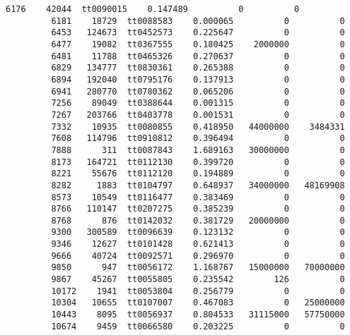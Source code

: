 \documentclass[11pt]{article}
\begin{document}
\begin{Verbatim}[commandchars=\\\{\}]
         6176    42044  tt0090015    0.147489          0          0   
         6181    18729  tt0088583    0.000065          0          0   
         6453   124673  tt0452573    0.225647          0          0   
         6477    19082  tt0367555    0.180425    2000000          0   
         6481    11788  tt0465326    0.270637          0          0   
         6829   134777  tt0830361    0.265388          0          0   
         6894   192040  tt0795176    0.137913          0          0   
         6941   280770  tt0780362    0.065206          0          0   
         7256    89049  tt0388644    0.001315          0          0   
         7267   203766  tt0403778    0.001531          0          0   
         7332    10935  tt0080855    0.418950   44000000    3484331   
         7608   114796  tt0910812    0.396494          0          0   
         7888      311  tt0087843    1.689163   30000000          0   
         8173   164721  tt0112130    0.399720          0          0   
         8221    55676  tt0112120    0.194889          0          0   
         8282     1883  tt0104797    0.648937   34000000   48169908   
         8573    10549  tt0116477    0.383469          0          0   
         8766   110147  tt0207275    0.385239          0          0   
         8768      876  tt0142032    0.381729   20000000          0   
         9300   300589  tt0096639    0.123132          0          0   
         9346    12627  tt0101428    0.621413          0          0   
         9666    40724  tt0092571    0.296970          0          0   
         9850      947  tt0056172    1.168767   15000000   70000000   
         9867    45267  tt0055805    0.235542        126          0   
         10172    1941  tt0053804    0.256779          0          0   
         10304   10655  tt0107007    0.467083          0   25000000   
         10443    8095  tt0056937    0.804533   31115000   57750000   
         10674    9459  tt0066580    0.203225          0          0   
         

\end{Verbatim}
\end{document}
